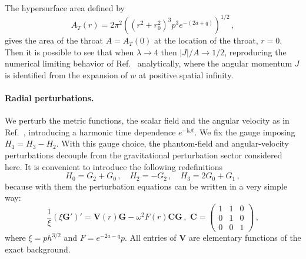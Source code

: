 \documentclass[aps,prl,reprint,superscriptaddress,nofootinbib,floatfix]{revtex4-2}
\newcommand{\ii}{\mathrm i}
\newcommand{\Gv}{\bm G}
\begin{document}
The hypersurface area defined by
\begin{equation}
    A_T({r}) = 2\pi^2
    \left( 
    ({r}^2 + r_0^2)^3 p^3 e^{-(2a+q)}
    \right)^{1/2} \, ,
\end{equation}
gives the area of the throat $A=A_T(0)$ at the location of the throat, ${r}=0$.
Then it is possible to see that when $\lambda\rightarrow4$ then $|J|/A\rightarrow1/2$, reproducing the numerical limiting behavior of Ref.~\cite{Dzhunushaliev:2013jja} analytically,
where the angular momentum $J$ is identified from the expansion of $w$ at
positive spatial infinity.

\paragraph{Radial perturbations.}
We perturb the metric functions, the scalar field and the angular velocity as in Ref.~\cite{Dzhunushaliev:2013jja}, introducing a harmonic time dependence $e^{-\ii\omega t}$. 
We fix the gauge imposing $H_1=H_3-H_2$. 
With this gauge choice, the phantom-field and angular-velocity perturbations decouple from the gravitational perturbation sector considered here.
It is convenient to introduce the following redefinitions
\begin{equation}
 H_0=G_2+G_0 \,,\quad H_2=-G_2 \,,\quad H_3=2G_0+G_1 \,,
\end{equation}
because with them the perturbation equations can be written in a very simple way:
\begin{equation}
 \frac1{\xi}(\xi\Gv')'=\bm V({r})\Gv-\omega^2F({r})\bm C\Gv\,,
 \,\,
 \bm C=\begin{pmatrix}1&1&0\\0&1&0\\0&0&1\end{pmatrix}\,,
 \label{eq:pert}
\end{equation}
where $\xi=ph^{3/2}$ and $F=e^{-2a-q}p$.  All entries of $\bm V$ are elementary functions of the exact background.
\end{document}
